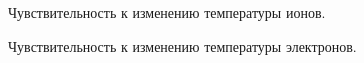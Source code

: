 \documentclass[14pt, a4paper, fleqn]{extarticle}
\begin{document}
\begin{figure}
\caption{Чувствительность к изменению температуры ионов.}
\end{figure}

\begin{figure}
\caption{Чувствительность к изменению температуры электронов.}
\end{figure}
\end{document}
